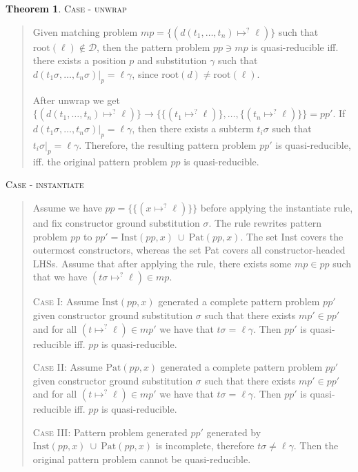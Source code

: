 \documentclass{report}
\theoremstyle{definition}
\newtheorem{theorem_inner}{Theorem}
\newenvironment{theorem}
  {\begin{customblock}\begin{theorem_inner}}
  {\end{theorem_inner}\end{customblock}}
\begin{document}
\begin{theorem}
\textsc{Case - unwrap} 
\begin{quote}
    Given matching problem $mp = \{(d(t_1,\dots,t_n)\mapsto^? \ell)\}$ such that $\text{root}(\ell) \not\in \mathcal{D}$, then the pattern problem $pp \ni mp$ is quasi-reducible iff. there exists a position $p$ and substitution $\gamma$ such that $d(t_1\sigma,\dots,t_n\sigma)|_p = \ell\gamma$, since $\text{root}(d) \neq \text{root}(\ell)$.

    After unwrap we get $\{(d(t_1,\dots,t_n)\mapsto^? \ell)\} \rightarrow \{\{(t_1\mapsto^? \ell)\}, \dots, \{(t_n\mapsto^? \ell)\}\} = pp'$. If $d(t_1\sigma,\dots,t_n\sigma)|_p = \ell\gamma$, then there exists a subterm $t_i\sigma$ such that $t_i\sigma|_p = \ell\gamma$. Therefore, the resulting pattern problem $pp'$ is quasi-reducible, iff. the original pattern problem $pp$ is quasi-reducible.
\end{quote}

\textsc{Case - instantiate}
\begin{quote}
    Assume we have $pp = \{\{(x\mapsto^? \ell)\}\}$ before applying the instantiate rule, and fix constructor ground substitution $\sigma$. The rule rewrites pattern problem $pp$ to $pp' = \text{Inst}(pp, x)\ \cup\ \text{Pat}(pp, x)$. The set Inst covers the outermost constructors, whereas the set Pat covers all constructor-headed LHSs.
    Assume that after applying the rule, there exists some $mp \in pp$ such that we have $(t\sigma\mapsto^? \ell) \in mp$.

    \textsc{Case I:}
    Assume $\text{Inst}(pp, x)$ generated a complete pattern problem $pp'$ given constructor ground substitution $\sigma$ such that there exists $mp' \in pp'$ and for all $(t\mapsto^? \ell) \in mp'$ we have that $t\sigma = \ell\gamma$. Then $pp'$ is quasi-reducible iff. $pp$ is quasi-reducible.

    \textsc{Case II:}
    Assume $\text{Pat}(pp, x)$ generated a complete pattern problem $pp'$ given constructor ground substitution $\sigma$ such that there exists $mp' \in pp'$ and for all $(t\mapsto^? \ell) \in mp'$ we have that $t\sigma = \ell\gamma$. Then $pp'$ is quasi-reducible iff. $pp$ is quasi-reducible.

    \textsc{Case III:}
    Pattern problem generated $pp'$ generated by $\text{Inst}(pp, x)\ \cup\ \text{Pat}(pp, x)$ is incomplete, therefore $t\sigma \neq \ell\gamma$. Then the original pattern problem cannot be quasi-reducible.
\end{quote}
\end{theorem}
\end{document}
